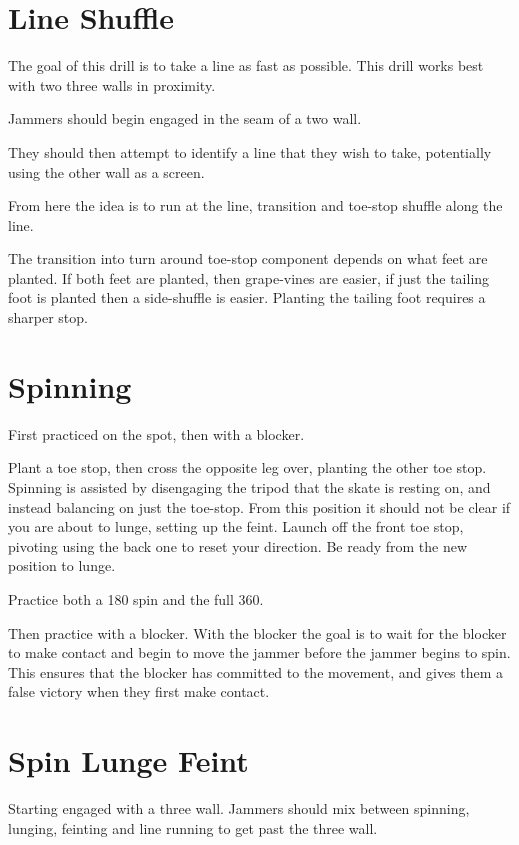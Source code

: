 \documentclass{journal}
\begin{document}
\section*{Line Shuffle}
\label{drill:static_block:line_shuffle}

The goal of this drill is to take a line as fast as possible.
This drill works best with two three walls in proximity.

Jammers should begin engaged in the seam of a two wall.

They should then attempt to identify a line that they wish to take, potentially using the other wall as a screen.

From here the idea is to run at the line, transition and toe-stop shuffle along the line. 

The transition into turn around toe-stop component depends on what feet are planted. 
If both feet are planted, then grape-vines are easier, if just the tailing foot is planted then a side-shuffle is easier.    
Planting the tailing foot requires a sharper stop. 

\section*{Spinning}
\label{drill:static_block:spin_to_win}
First practiced on the spot, then with a blocker. 

Plant a toe stop, then cross the opposite leg over, planting the other toe stop.
Spinning is assisted by disengaging the tripod that the skate is resting on, and instead balancing on just the toe-stop.
From this position it should not be clear if you are about to lunge, setting up the feint. 
Launch off the front toe stop, pivoting using the back one to reset your direction. 
Be ready from the new position to lunge.

Practice both a 180 spin and the full 360.

Then practice with a blocker.
With the blocker the goal is to wait for the blocker to make contact and begin to move the jammer before the jammer begins to spin.  
This ensures that the blocker has committed to the movement, and gives them a false victory when they first make contact. 

\section*{Spin Lunge Feint}
\label{drill:static_block:spin_lunge_feint}
Starting engaged with a three wall. 
Jammers should mix between spinning, lunging, feinting and line running to get past the three wall. 
\end{document}
